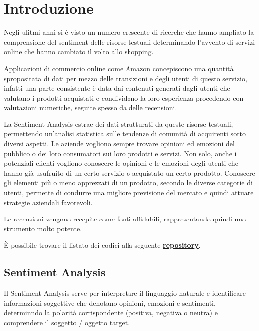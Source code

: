 \documentclass[a4paper,12pt]{article}
\begin{document}
\tableofcontents

\newpage

\section{Introduzione}
Negli ulitmi anni si è visto un numero crescente di ricerche che hanno ampliato la comprensione del sentiment delle risorse testuali determinando l’avvento di servizi online che hanno cambiato
il volto allo shopping. 

\noindent Applicazioni di commercio online come Amazon concepiscono
una quantità spropositata di dati per mezzo delle transizioni e degli utenti di
questo servizio, infatti una parte consistente è data dai contenuti generati dagli
utenti che valutano i prodotti acquistati e condividono la loro esperienza procedendo con valutazioni numeriche, seguite spesso da delle recensioni.

\noindent La Sentiment Analysis estrae dei dati strutturati da queste risorse testuali, permettendo un'analisi statistica sulle tendenze di comunità di acquirenti sotto diversi aspetti. Le aziende vogliono sempre trovare opinioni ed emozioni del pubblico o dei loro consumatori sui loro prodotti e servizi. Non solo, anche i potenziali clienti vogliono conoscere le opinioni e le emozioni degli utenti che hanno già usufruito di un certo servizio o acquistato un certo prodotto. Conoscere gli elementi più o meno apprezzati di un prodotto, secondo le diverse categorie di utenti, permette di condurre una migliore previsione del mercato e quindi attuare strategie aziendali favorevoli. 

\noindent Le recensioni vengono recepite come fonti affidabili, rappresentando quindi uno strumento molto potente.
\bigskip

\noindent È possibile trovare il listato dei codici alla seguente \href{https://github.com/okamiRvS/Sentiment-Analysis-for-Amazon-Reviews}{\textbf{repository}}.


\newpage

\subsection{Sentiment Analysis}
Il Sentiment Analysis serve per interpretare il linguaggio naturale e identificare informazioni soggettive che denotano opinioni, emozioni e sentimenti, determinndo la polarità corrispondente (positiva, negativa o neutra) e comprendere il soggetto / oggetto target. 
\end{document}
